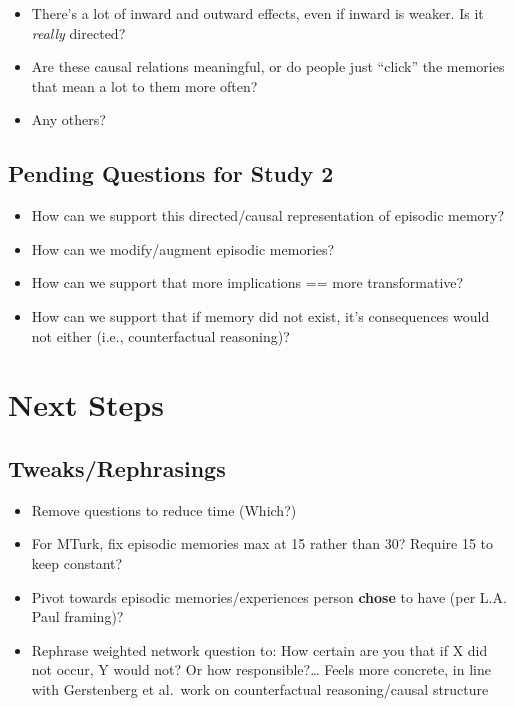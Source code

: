 \documentclass[
  .7em,
  letterpaper,
  DIV=11,
  numbers=noendperiod]{scrartcl}
\begin{document}
\begin{itemize}
\item
  There's a lot of inward and outward effects, even if inward is weaker.
  Is it \emph{really} directed?
\item
  Are these causal relations meaningful, or do people just ``click'' the
  memories that mean a lot to them more often?
\item
  Any others?
\end{itemize}

\hypertarget{pending-questions-for-study-2}{%
\subsection{Pending Questions for Study
2}\label{pending-questions-for-study-2}}

\begin{itemize}
\item
  How can we support this directed/causal representation of episodic
  memory?
\item
  How can we modify/augment episodic memories?
\item
  How can we support that more implications == more transformative?
\item
  How can we support that if memory did not exist, it's consequences
  would not either (i.e., counterfactual reasoning)?
\end{itemize}

\hypertarget{next-steps}{%
\section{Next Steps}\label{next-steps}}

\hypertarget{tweaksrephrasings}{%
\subsection{Tweaks/Rephrasings}\label{tweaksrephrasings}}

\begin{itemize}
\item
  Remove questions to reduce time (Which?)
\item
  For MTurk, fix episodic memories max at 15 rather than 30? Require 15
  to keep constant?
\item
  Pivot towards episodic memories/experiences person \textbf{chose} to
  have (per L.A. Paul framing)?
\item
  Rephrase weighted network question to: How certain are you that if X
  did not occur, Y would not? Or how responsible?\ldots{} Feels more
  concrete, in line with Gerstenberg et al.~work on counterfactual
  reasoning/causal structure
\end{itemize}
\end{document}
